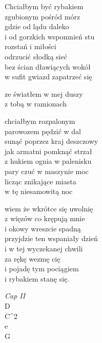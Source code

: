 \begin{text}
    \hfill\break
    Chciałbym być rybakiem\\
    zgubionym pośród mórz\\
    gdzie od lądu daleko\\
    i od gorzkich wspomnień stu\\
    rozstań i miłości\\
    odrzucić słodką sieć\\
    bez ścian dławiących wokół\\
    w sufit gwiazd zapatrzeć się

    ze światłem w mej duszy\\
    z tobą w ramionach

    chciałbym rozpalonym\\
    parowozem pędzić w dal\\
    sunąć poprzez kraj deszczowy\\
    jak armatni pomknąć strzał\\
    z hukiem ognia w palenisku\\
    pary czuć w maszynie moc\\
    licząc znikające miasta\\
    w tę niesamowitą noc

    wiem że wkrótce się uwolnię\\
    z więzów co krępują mnie\\
    i okowy wreszcie spadną\\
    przyjdzie ten wspaniały dzień\\
    i w tej wyczekanej chwili\\
    za rękę wezmę cię\\
    i pojadę tym pociągiem\\
    i rybakiem stanę się.
\end{text}
\begin{chord}
    \textit{Cap II}\\
    D\\
    C^2\\
    e\\
    G
\end{chord}
